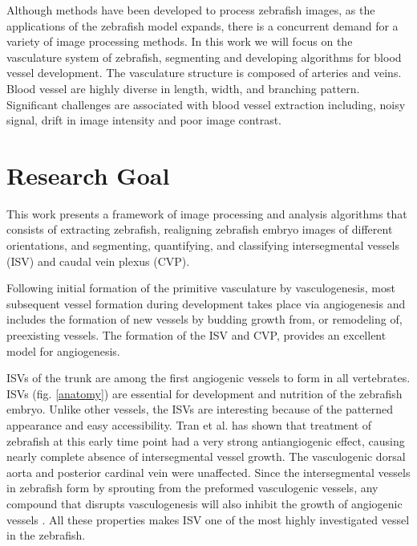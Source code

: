 Although methods have been developed to process zebraﬁsh images, as the applications of the zebraﬁsh model expands, there is a concurrent demand for a variety of image processing methods. In this work we will focus on the vasculature system of zebrafish, segmenting and developing algorithms for blood vessel development. The vasculature structure is composed of arteries and veins. Blood vessel are highly diverse in length, width, and branching pattern. Significant challenges are associated with blood vessel extraction including, noisy signal, drift in image intensity and poor image contrast.


\section{Research Goal}


This work presents a framework of image processing and analysis algorithms that consists of extracting zebrafish, realigning zebrafish embryo images of different orientations, and segmenting, quantifying, and classifying intersegmental vessels (ISV) and caudal vein plexus (CVP). 

Following initial formation of the primitive vasculature by vasculogenesis, most subsequent vessel formation during development takes place via angiogenesis and includes the formation of new vessels by budding growth from, or remodeling of, preexisting vessels. The formation of the ISV and CVP, provides an excellent model for angiogenesis.

ISVs of the trunk are among the first angiogenic vessels to form in all vertebrates. ISVs (fig. \ref{anatomy}) are essential for development and nutrition of the zebrafish embryo. Unlike other vessels, the ISVs are interesting because of the patterned appearance and easy accessibility. Tran et al. \cite{Tran07} has shown that treatment of zebrafish at this early time point had a very strong antiangiogenic effect, causing nearly complete absence of intersegmental vessel growth. The vasculogenic dorsal aorta and posterior cardinal vein were unaffected. Since the intersegmental vessels in zebrafish form by sprouting from the preformed vasculogenic vessels, any compound that disrupts vasculogenesis will also inhibit the growth of angiogenic vessels \cite{Tran07}. All these properties makes ISV one of the most highly investigated vessel in the zebrafish. 

